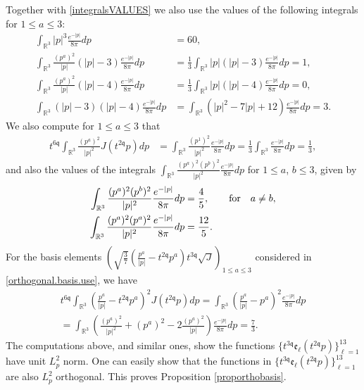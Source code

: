 \documentclass[reqno]{amsart}
\newcommand{\pv}{p}
\newcommand{\pZ}{|\pv|}
\newcommand{\rth}{{\mathbb{R}^3}}
\newcommand{\qq}{\mathfrak{q}}
\newcommand{\tqq}{t^{2\qq}}
\newcommand{\tTq}{t^{3\qq}}
\newcommand{\tQQq}{t^{6\qq}}
\theoremstyle{definition}
\numberwithin{equation}{section}
\numberwithin{theorem}{section}
\begin{document}
Together with \eqref{integralsVALUES} we also use the values of the following integrals for $1 \leq a \leq 3$:
\begin{align*}
    \int_\rth | \pv |^3  \frac{e^{- |\pv|}}{8\pi} dp &= 60,
    \\
\int_{\rth}   \frac{ (\pv^a )^2}{{\pZ}}( {\pZ}-3) \frac{e^{- |\pv|}}{8\pi}      dp
&=
\frac{1}{3}
\int_{\rth}   {\pZ}( {\pZ}-3) \frac{e^{- |\pv|}}{8\pi}dp =1,
\\
\int_{\rth}   \frac{ (\pv^a )^2}{{\pZ}}( {\pZ}-4) \frac{e^{- |\pv|}}{8\pi}      dp
&=
\frac{1}{3}
\int_{\rth}   {\pZ}( {\pZ}-4) \frac{e^{- |\pv|}}{8\pi}      dp
=0,
\\
\int_{\rth}   ( {\pZ}-3)( {\pZ}-4) \frac{e^{- |\pv|}}{8\pi}      dp
&=
\int_{\rth}   ( {\pZ}^2-7{\pZ}+12) \frac{e^{- |\pv|}}{8\pi}      dp
=3.
\end{align*}
We also compute for $1 \leq a \leq 3$ that
\begin{align*}
 \tQQq   \int_\rth \frac{(p^a)^2}{{| \pv |^2}}J(\tqq p)dp
                  &=\int_\rth \frac{( p^1)^2}{{| \pv |^2}}  \frac{e^{- |\pv|}}{8\pi} dp               =
              \frac{1}{3}\int_\rth  \frac{e^{- |\pv|}}{8\pi} dp = \frac{1}{3},
\end{align*}
and also the values of the integrals $\int_{\rth} \frac{(\pv^a )^2(\pv^b)^2}{{\pZ^2}}  \frac{e^{- |\pv|}}{8\pi} 
    dp$ for $1\leq a$, $b \leq 3$, given by
\begin{equation}\notag
\begin{split}
\int_{\rth} \frac{(\pv^a )^2(\pv^b)^2}{{\pZ^2}}  \frac{e^{- |\pv|}}{8\pi} 
    dp
&=
\frac{4}{5},
\qquad \text{for}\quad a \neq b,
\\
\int_{\rth} \frac{(\pv^a )^2(\pv^a)^2}{{\pZ^2}}  \frac{e^{- |\pv|}}{8\pi} 
    dp
&=
\frac{12}{5}.
\end{split}
\end{equation}
For the basis elements \(\left(\sqrt{\frac{3}{7}}
\left(\frac{p^a}{{\pZ}} -\tqq \pv^a\right)\tTq\sqrt{J}\right)_{1\leq a\leq 3}\) considered in \eqref{orthogonal.basis.use}, we have
\begin{multline*}
       \tQQq\int_\rth \left(\frac{p^a}{{| \pv |}}- \tqq p^a\right)^2 J(\tqq p)dp
                  =\int_\rth \left(\frac{p^a}{{| \pv |}}-  p^a\right)^2  \frac{e^{- |\pv|}}{8\pi} dp               
                  \\
=\int_\rth \left(\frac{\left(p^a\right)^2 }{{| \pv |^2}} +  \left(p^a\right)^2 -2\frac{\left(p^a\right)^2}{{| \pv |}} \right) \frac{e^{- |\pv|}}{8\pi} dp  
=\frac{7}{3}.
\end{multline*}
The computations above, and similar ones, show the functions $\{\tTq \mathfrak{e}_{\ell}(\tqq \pv)\}_{\ell=1}^{13}$ have unit \(L^2_p\) norm. One can easily show that the functions in $\{\tTq \mathfrak{e}_{\ell}(\tqq \pv)\}_{\ell=1}^{13}$ are also \(L^2_p\)  orthogonal. This proves Proposition \ref{proporthobasis}.
\end{document}
